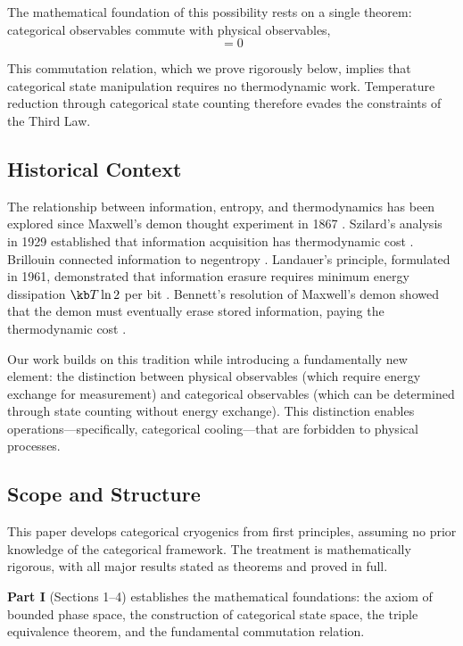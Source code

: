 The mathematical foundation of this possibility rests on a single theorem: categorical observables commute with physical observables,
\begin{equation}
[\Ocat, \Ophys] = 0
\label{eq:commutation_intro}
\end{equation}

This commutation relation, which we prove rigorously below, implies that categorical state manipulation requires no thermodynamic work. Temperature reduction through categorical state counting therefore evades the constraints of the Third Law.

\subsection{Historical Context}

The relationship between information, entropy, and thermodynamics has been explored since Maxwell's demon thought experiment in 1867 \cite{maxwell1867}. Szilard's analysis in 1929 established that information acquisition has thermodynamic cost \cite{szilard1929}. Brillouin connected information to negentropy \cite{brillouin1951}. Landauer's principle, formulated in 1961, demonstrated that information erasure requires minimum energy dissipation $\kb T \ln 2$ per bit \cite{landauer1961}. Bennett's resolution of Maxwell's demon showed that the demon must eventually erase stored information, paying the thermodynamic cost \cite{bennett1982,bennett2003}.

Our work builds on this tradition while introducing a fundamentally new element: the distinction between physical observables (which require energy exchange for measurement) and categorical observables (which can be determined through state counting without energy exchange). This distinction enables operations---specifically, categorical cooling---that are forbidden to physical processes.

\subsection{Scope and Structure}

This paper develops categorical cryogenics from first principles, assuming no prior knowledge of the categorical framework. The treatment is mathematically rigorous, with all major results stated as theorems and proved in full.

\textbf{Part I} (Sections 1--4) establishes the mathematical foundations: the axiom of bounded phase space, the construction of categorical state space, the triple equivalence theorem, and the fundamental commutation relation.

